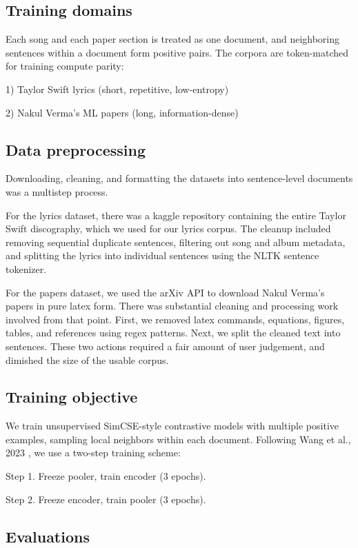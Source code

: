 \documentclass{article}
\begin{document}
\subsection{Training domains}
Each song and each paper section is treated as one document, and neighboring sentences
within a document form positive pairs. The corpora are token-matched for training compute parity:

1) Taylor Swift lyrics (short, repetitive, low-entropy)

2) Nakul Verma's ML papers (long, information-dense)

\subsection{Data preprocessing}
Downloading, cleaning, and formatting the datasets into sentence-level documents was a
multistep process.

For the lyrics dataset, there was a kaggle repository containing the entire Taylor Swift
discography, which we used for our lyrics corpus. The cleanup included removing
sequential duplicate sentences, filtering out song and album metadata, and splitting the
lyrics into individual sentences using the NLTK sentence tokenizer.

For the papers dataset, we used the arXiv API to download Nakul Verma's papers in pure latex form. There was
substantial cleaning and processing work involved from that point. First, we removed latex commands,
equations, figures, tables, and references using regex patterns. Next, we split the cleaned text into
sentences. These two actions required a fair amount of user judgement, and dimished the size of the usable corpus.
\subsection{Training objective}
We train unsupervised SimCSE-style contrastive models with multiple positive examples,
sampling local neighbors within each document. Following Wang et al., 2023
\cite{wang2023}, we use a two-step training scheme:

Step 1. Freeze pooler, train encoder (3 epochs).

Step 2. Freeze encoder, train pooler (3 epochs).

\subsection{Evaluations}
\end{document}

